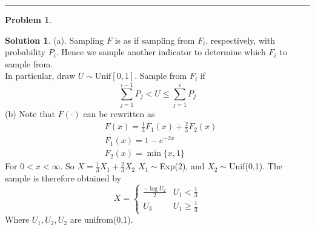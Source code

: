 \documentclass[a4paper, 10pt]{article}
\theoremstyle{definition}
\newtheorem{problem}{Problem}
\theoremstyle{hSol}
\newtheorem*{solution}{Solution}
\begin{document}
\noindent\rule{16cm}{0.4pt}
\begin{problem} 
\end{problem}
\begin{solution} (a). Sampling $F$ is as if sampling from $F_i$, respectively, with probability $P_i$. Hence we sample another indicator to determine which $F_i$ to sample from. \\
In particular, draw $U\sim\text{Unif}[0,1]$. Sample from $F_i$ if 
$$
\sum_{j=1}^{i-1} P_j < U \leq \sum_{j=1}^{i} P_j 
$$
(b) Note that $F(\cdot)$ can be rewritten as
\begin{equation}
  \begin{split}
    & F(x) = \frac{1}{3}F_1(x) + \frac{2}{3}F_2(x) \\
    & F_1(x)=1-e^{-2x} \\
    & F_2(x)=\min\{x,1\}
  \end{split}
\end{equation}
For $0<x<\infty$. So $X=\frac{1}{3}X_1+\frac{2}{3}X_2$ $X_1\sim$Exp(2), and $X_2\sim$Unif(0,1). The sample is therefore obtained by
\begin{equation}
  X = \begin{cases}
  \frac{-\log U_2}{2} & U_1 < \frac{1}{3} \\
  U_3 & U_1 \geq \frac{1}{3}
  \end{cases}
\end{equation}
Where $U_1, U_2, U_2$ are unifrom(0,1).
\end{solution}
\end{document}
